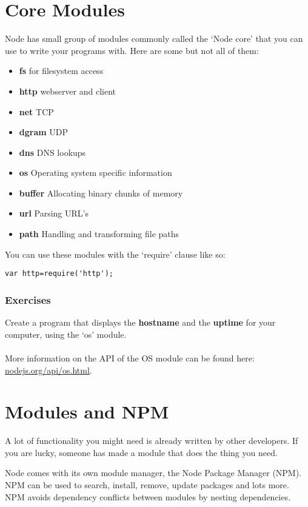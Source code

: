 \documentclass[a4paper]{report}
\begin{document}
\section*{Core Modules} 
Node has small group of modules commonly called the `Node core' that you can use to write your programs with. Here are some but not all of them: 
\begin{itemize} 
	\item \textbf{fs} for filesystem access 
	\item \textbf{http} webserver and client 
	\item \textbf{net} TCP 
	\item \textbf{dgram} UDP 
	\item \textbf{dns} DNS lookups 
	\item \textbf{os} Operating system specific information 
	\item \textbf{buffer} Allocating binary chunks of memory 
	\item \textbf{url} Parsing URL's 
	\item \textbf{path} Handling and transforming file paths 
\end{itemize} 
 
\noindent You can use these modules with the `require' clause like so: 
\begin{lstlisting} 
var http=require('http'); 
\end{lstlisting} 
 
\subsubsection*{Exercises} 
Create a program that displays the \textbf{hostname} and the \textbf{uptime} for your computer, using the `os' module.\\ 
\\ 
\noindent More information on the API of the OS module can be found here: \href{http://nodejs.org/api/os.html}{nodejs.org/api/os.html}. 
 
\section*{Modules and NPM} 
A lot of functionality you might need is already written by other developers. If you are lucky, someone has made a module that does the thing you need.
 
Node comes with its own module manager, the Node Package Manager (NPM). NPM can be used to search, install, remove, update packages and lots more. NPM avoids dependency conflicts between modules by nesting dependencies. 
 
\end{document}
